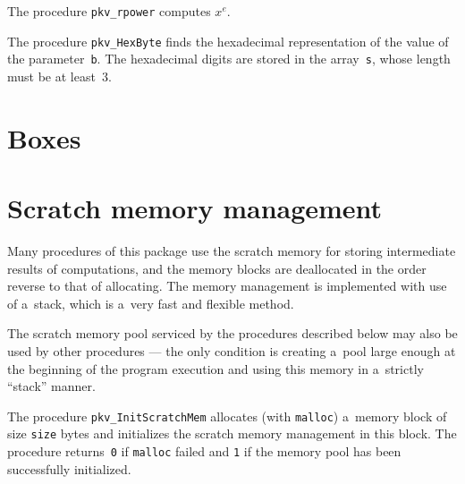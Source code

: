 \vspace{\bigskipamount}
The procedure \texttt{pkv\_rpower} computes $x^e$.

\vspace{\bigskipamount}
The procedure \texttt{pkv\_HexByte} finds the hexadecimal representation of
the value of the parameter~\texttt{b}. The hexadecimal digits are
stored in the array~\texttt{s}, whose length must be at least~$3$.


\section{Boxes}


\mbox{} 


\section{\label{sect:scratch:mem}Scratch memory management}

Many procedures of this package use the scratch memory for storing
intermediate results of computations, and the memory blocks are deallocated
in the order reverse to that of allocating. The memory management is
implemented with use of a~stack, which is a~very fast and flexible
method.

The scratch memory pool serviced by the procedures described below
may also be used by other procedures --- the only condition is
creating a~pool large enough at the beginning of the program execution
and using this memory in a~strictly ``stack'' manner.

\vspace{\bigskipamount}
The procedure \texttt{pkv\_InitScratchMem} allocates (with
\texttt{malloc}) a~memory block of size \texttt{size}
bytes and initializes the scratch memory management in this block.
The procedure returns~\texttt{0} if \texttt{malloc} failed and
\texttt{1} if the memory pool has been successfully initialized.

